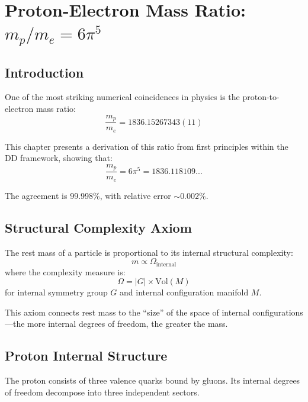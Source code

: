 \chapter{Proton-Electron Mass Ratio: $m_p/m_e = 6\pi^5$}
\label{chap:mass_ratio}

\section{Introduction}

One of the most striking numerical coincidences in physics is the proton-to-electron mass ratio:
\begin{equation}
\frac{m_p}{m_e} = 1836.15267343(11)
\end{equation}

This chapter presents a derivation of this ratio from first principles within the DD framework, showing that:
\begin{equation}
\boxed{\frac{m_p}{m_e} = 6\pi^5 = 1836.118109...}
\end{equation}

The agreement is 99.998\%, with relative error $\sim 0.002\%$.

\section{Structural Complexity Axiom}

\begin{axiom}
The rest mass of a particle is proportional to its internal structural complexity:
\begin{equation}
m \propto \Omega_{\text{internal}}
\end{equation}
where the complexity measure is:
\begin{equation}
\Omega = |G| \times \text{Vol}(M)
\end{equation}
for internal symmetry group $G$ and internal configuration manifold $M$.
\end{axiom}

This axiom connects rest mass to the ``size'' of the space of internal configurations---the more internal degrees of freedom, the greater the mass.

\section{Proton Internal Structure}

The proton consists of three valence quarks bound by gluons. Its internal degrees of freedom decompose into three independent sectors.

